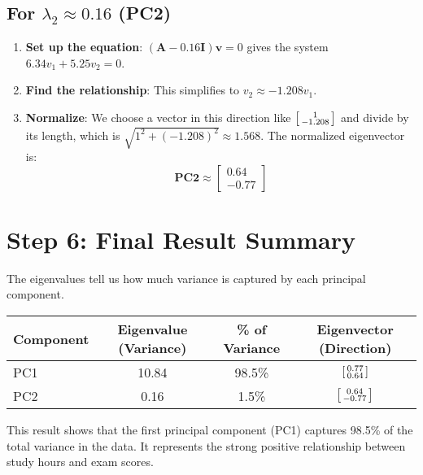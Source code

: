 \documentclass{article}
\begin{document}
\subsection{For $\lambda_2 \approx 0.16$ (PC2)}
\begin{enumerate}
    \item \textbf{Set up the equation}: $(\mathbf{A} - 0.16\mathbf{I})\mathbf{v} = 0$ gives the system $6.34v_1 + 5.25v_2 = 0$.
    \item \textbf{Find the relationship}: This simplifies to $v_2 \approx -1.208v_1$.
    \item \textbf{Normalize}: We choose a vector in this direction like $\begin{bsmallmatrix} 1 \\ -1.208 \end{bsmallmatrix}$ and divide by its length, which is $\sqrt{1^2 + (-1.208)^2} \approx 1.568$. The normalized eigenvector is:
    \[ \textbf{PC2} \approx \begin{bmatrix} 0.64 \\ -0.77 \end{bmatrix} \]
\end{enumerate}

\section{Step 6: Final Result Summary}

The eigenvalues tell us how much variance is captured by each principal component.

\begin{table}[h!]
\centering
\begin{tabular}{lccc}
\toprule
\textbf{Component} & \textbf{Eigenvalue (Variance)} & \textbf{\% of Variance} & \textbf{Eigenvector (Direction)} \\
\midrule
PC1 & 10.84 & 98.5\% & $\begin{bsmallmatrix} 0.77 \\ 0.64 \end{bsmallmatrix}$ \\
\addlinespace
PC2 & 0.16 & 1.5\% & $\begin{bsmallmatrix} 0.64 \\ -0.77 \end{bsmallmatrix}$ \\
\bottomrule
\end{tabular}
\end{table}

This result shows that the first principal component (PC1) captures 98.5\% of the total variance in the data. It represents the strong positive relationship between study hours and exam scores.
\end{document}
